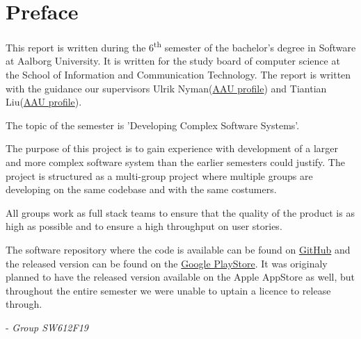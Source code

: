 \chapter*{Preface}
This report is written during the 6\textsuperscript{th} semester of the bachelor's degree in Software at Aalborg University.
It is written for the study board of computer science at the School of Information and Communication Technology.
The report is written with the guidance our supervisors Ulrik Nyman(\href{http://personprofil.aau.dk/profil/110550}{AAU profile}) and Tiantian Liu(\href{http://personprofil.aau.dk/profil/145323}{AAU profile}).

The topic of the semester is 'Developing Complex Software Systems'.

The purpose of this project is to gain experience with development of a larger and more complex software system than the earlier semesters could justify.
The project is structured as a multi-group project where multiple groups are developing on the same codebase and with the same costumers.

All groups work as full stack teams to ensure that the quality of the product is as high as possible and to ensure a high throughput on user stories.

The software repository where the code is available can be found on \href{https://github.com/aau-giraf/}{GitHub} and the released version can be found on the \href{https://play.google.com/store/apps/details?id=dk.aau.cs.giraf.weekplanner}{Google PlayStore}.
It was originaly planned to have the released version available on the Apple AppStore as well, but throughout the entire semester we were unable to uptain a licence to release through.

- \textit{Group SW612F19}

\newpage
